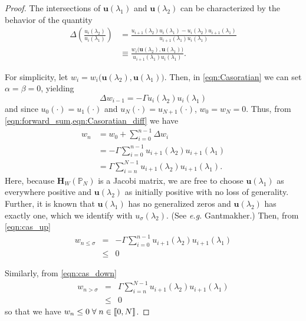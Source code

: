   \begin{proof}
    The intersections of $\mathbf{u}(\lambda_1)$ and $\mathbf{u}(\lambda_2)$ can be characterized by the behavior of the quantity
    \begin{align}
      \Delta\left(\frac{u_i(\lambda_2)}{u_i(\lambda_1)} \right) &= \frac{u_{i+1}(\lambda_2)u_i(\lambda_1)-u_i(\lambda_2)u_{i+1}(\lambda_1)}{u_{i+1}(\lambda_1)u_i(\lambda_1)} \\
								&\equiv \frac{w_i\big(\mathbf{u}(\lambda_2),\mathbf{u}(\lambda_1)\big)}{u_{i+1}(\lambda_1)u_i(\lambda_1)}. \label{eq:cas_temp}
    \end{align}

    For simplicity, let $w_i = w_i\big(\mathbf{u}(\lambda_2),\mathbf{u}(\lambda_1)\big)$. Then, in \cref{eqn:Casoratian} we can set $\alpha=\beta=0$, yielding
    \begin{equation}\label{eqn:Casoratian_diff}
      \Delta w_{i-1} = -\Gamma u_i(\lambda_2)u_i(\lambda_1)
    \end{equation}
    and since $u_0(\cdot) = u_1(\cdot)$ and $u_N(\cdot) = u_{N+1}(\cdot)$, $w_{0}=w_{N}=0$. Thus, from \cref{eqn:forward_sum,eqn:Casoratian_diff} we have
    \begin{align}
      w_n &= w_0 + \sum_{i=0}^{n-1}\Delta w_i \\
	  &= -\Gamma \sum_{i=0}^{n-1}u_{i+1}(\lambda_2)u_{i+1}(\lambda_1) \label{eqn:cas_up} \\
	  &= \Gamma \sum_{i=n}^{N-1}u_{i+1}(\lambda_2)u_{i+1}(\lambda_1) \label{eqn:cas_down}.
    \end{align}
    Here, because $\mathbf{H}_W(\mathbb{P}_N)$ is a Jacobi matrix, we are free to choose $\mathbf{u}(\lambda_1)$ as everywhere positive and $\mathbf{u}(\lambda_2)$ as initially positive with no loss of generality. Further, it is known that $\mathbf{u}(\lambda_1)$ has no generalized zeros and $\mathbf{u}(\lambda_2)$ has exactly one, which we identify with $u_{\sigma}(\lambda_2)$. (See \textit{e.g.} Gantmakher.\cite{gantmakher2002oscillation}) Then, from \cref{eqn:cas_up}
    \begin{eqnarray}
      w_{n\leq \sigma} &=& -\Gamma \sum_{i=0}^{n-1}u_{i+1}(\lambda_2)u_{i+1}(\lambda_1) \\
		  &\leq& 0
    \end{eqnarray}

    Similarly, from \cref{eqn:cas_down}
    \begin{eqnarray}
      w_{n > \sigma} &=& \Gamma \sum_{i=n}^{N-1}u_{i+1}(\lambda_2)u_{i+1}(\lambda_1) \\
		&\leq& 0
    \end{eqnarray}
    so that we have $w_n \leq 0 \; \forall \; n \in \left \llbracket 0 , N \right \rrbracket$.


\end{proof}
